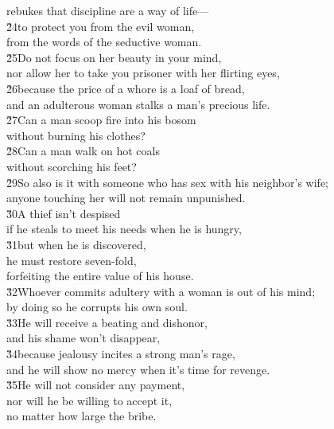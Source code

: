 \begin{poetry}
\poemlll       rebukes that discipline are a way of life--- \\
\poeml \v{24}to protect you from the evil woman, \\
\poemll    from the words of the seductive woman. \\
\poeml \v{25}Do not focus on her beauty in your mind, \\
\poemll    nor allow her to take you prisoner with her flirting eyes, \\
\poeml \v{26}because the price of a whore is a loaf of bread, \\
\poemll    and an adulterous woman stalks a man's precious life. \\
\poeml \v{27}Can a man scoop fire into his bosom \\
\poemll    without burning his clothes? \\
\poeml \v{28}Can a man walk on hot coals \\
\poemll    without scorching his feet? \\
\poeml \v{29}So also is it with someone who has sex with his neighbor's wife; \\
\poemll    anyone touching her will not remain unpunished. \\
\poeml \v{30}A thief isn't despised \\
\poemll    if he steals to meet his needs when he is hungry, \\
\poeml \v{31}but when he is discovered, \\
\poemll    he must restore seven-fold, \\
\poemlll       forfeiting the entire value of his house. \\
\poeml \v{32}Whoever commits adultery with a woman is out of his mind; \\
\poemll    by doing so he corrupts his own soul. \\
\poeml \v{33}He will receive a beating and dishonor, \\
\poemll    and his shame won't disappear, \\
\poeml \v{34}because jealousy incites a strong man's rage, \\
\poemll    and he will show no mercy when it's time for revenge. \\
\poeml \v{35}He will not consider any payment, \\
\poemll    nor will he be willing to accept it, \\
\poemlll       no matter how large the bribe.
\end{poetry}

